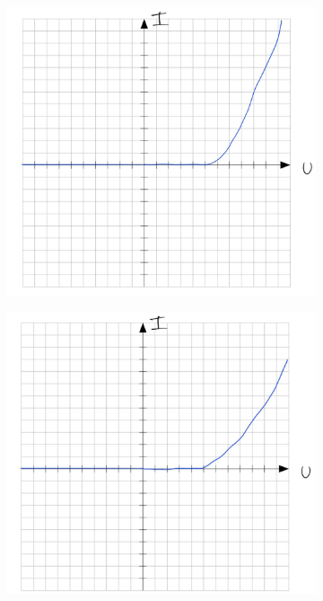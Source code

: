 \begin{figure}[H]
\begin{subfigure}[b]{0.45\textwidth}
        \includegraphics[width=\textwidth]{figs/Voraufgaben/Cb.jpg}
        \caption{}
        \label{fig:VA_C_b}
    \end{subfigure}
    \vspace{0.5em}
    \begin{subfigure}[b]{0.45\textwidth}
        \includegraphics[width=\textwidth]{figs/Voraufgaben/Cc.jpg}

\end{subfigure}
\end{figure}
